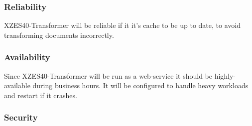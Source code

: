 
\subsubsection{Reliability}

XZES40-Transformer will be reliable if it it's cache to be up to date, to avoid transforming documents incorrectly.


\subsubsection{Availability}

Since XZES40-Transformer will be run as a web-service it should be highly-available during business hours.
It will be configured to handle heavy workloads and restart if it crashes.


\subsubsection{Security}


